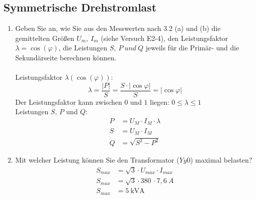 \subsection{Symmetrische Drehstromlast }
\begin{enumerate}[label=\alph*)]
	\item Geben Sie an, wie Sie aus den Messwerten nach 3.2 (a) und (b) die gemittelten
	      Größen $U_m,\ I_m$ (siehe Versuch E2-4), den Leistungsfaktor
	      $\lambda=\cos(\varphi)$, die Leistungen $S,\ P\ und\ Q$ jeweils für die Primär-
	      und die Sekundärseite berechnen können.\\ \ \\ Leistungsfaktor $\lambda(\cos
			      (\varphi))$:
	      \[ \lambda = \frac{|P|}{S}=\frac{S\cdot |\cos \varphi|}{S} = |\cos \varphi| \]
	      Der Leistungsfaktor kann zwischen $0$ und $1$ liegen: $0 \leq \lambda \leq 1
	      $\\ Leistungen $S$, $P$ und $Q$:\\
	      \begin{align*}
		      P & = U_M\cdot I_M\cdot \lambda \\
		      S & = U_M\cdot I_M              \\
		      Q & = \sqrt{S^2-P^2}
	      \end{align*}

	\item Mit welcher Leistung können Sie den Transformator ($Yy0$) maximal belasten?
	      \begin{align*}
		      S_{max} & = \sqrt 3 \cdot U_{max}\cdot I_{max} \\
		      S_{max} & = \sqrt 3 \cdot 380\ \cdot 7,6\ A    \\
		      S_{max} & = 5\ \text{kVA}
	      \end{align*}
\end{enumerate}
